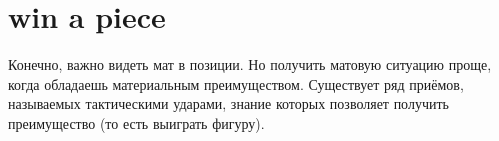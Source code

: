 \section*{win a piece}

Конечно, важно видеть мат в позиции. Но получить матовую ситуацию проще, когда обладаешь материальным преимуществом. Существует ряд приёмов, называемых тактическими ударами, знание которых позволяет получить преимущество (то есть выиграть фигуру).